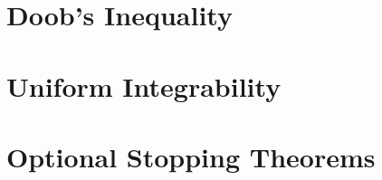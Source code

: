 \begin{theorem}

\end{theorem}

\begin{theorem}

\end{theorem}

\begin{definition}

\end{definition}

\begin{definition}

\end{definition}

\begin{theorem}

\end{theorem}

\section{Doob's Inequality}

\begin{theorem}

\end{theorem}

\begin{theorem}

\end{theorem}

\begin{theorem}

\end{theorem}

\section{Uniform Integrability}

\section{Optional Stopping Theorems}
